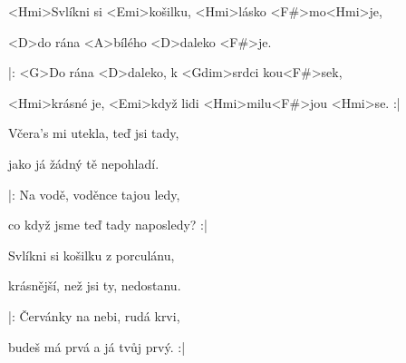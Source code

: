 

\zs
<Hmi>Svlíkni si <Emi>košilku, <Hmi>lásko <F#>mo<Hmi>je,

<D>do rána <A>bílého <D>daleko <F#>je.

|: <G>Do rána <D>daleko, k <Gdim>srdci kou<F#>sek,

<Hmi>krásné je, <Emi>když lidi <Hmi>milu<F#>jou <Hmi>se. :|
\ks

\zs
Včera's mi utekla, teď jsi tady,

jako já žádný tě nepohladí.

|: Na vodě, voděnce tajou ledy,

co když jsme teď tady naposledy? :|
\ks

\zs
Svlíkni si košilku z porculánu,

krásnější, než jsi ty, nedostanu.

|: Červánky na nebi, rudá krvi,

budeš má prvá a já tvůj prvý. :|
\ks

\kp

